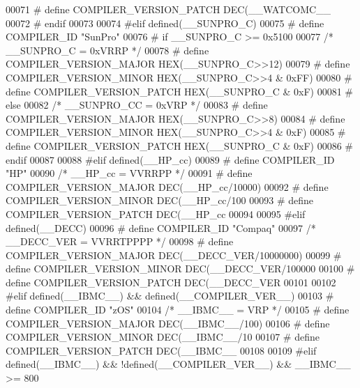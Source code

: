 \begin{DoxyCode}
{{{{{{{{00071 \textcolor{preprocessor}{#  define COMPILER\_VERSION\_PATCH DEC(\_\_WATCOMC\_\_ %
00072 \textcolor{preprocessor}{# endif}
00073 
00074 \textcolor{preprocessor}{#elif defined(\_\_SUNPRO\_C)}
00075 \textcolor{preprocessor}{# define COMPILER\_ID "SunPro"}
00076 \textcolor{preprocessor}{# if \_\_SUNPRO\_C >= 0x5100}
00077    \textcolor{comment}{/* \_\_SUNPRO\_C = 0xVRRP */}
00078 \textcolor{preprocessor}{#  define COMPILER\_VERSION\_MAJOR HEX(\_\_SUNPRO\_C>>12)}
00079 \textcolor{preprocessor}{#  define COMPILER\_VERSION\_MINOR HEX(\_\_SUNPRO\_C>>4 & 0xFF)}
00080 \textcolor{preprocessor}{#  define COMPILER\_VERSION\_PATCH HEX(\_\_SUNPRO\_C    & 0xF)}
00081 \textcolor{preprocessor}{# else}
00082    \textcolor{comment}{/* \_\_SUNPRO\_CC = 0xVRP */}
00083 \textcolor{preprocessor}{#  define COMPILER\_VERSION\_MAJOR HEX(\_\_SUNPRO\_C>>8)}
00084 \textcolor{preprocessor}{#  define COMPILER\_VERSION\_MINOR HEX(\_\_SUNPRO\_C>>4 & 0xF)}
00085 \textcolor{preprocessor}{#  define COMPILER\_VERSION\_PATCH HEX(\_\_SUNPRO\_C    & 0xF)}
00086 \textcolor{preprocessor}{# endif}
00087 
00088 \textcolor{preprocessor}{#elif defined(\_\_HP\_cc)}
00089 \textcolor{preprocessor}{# define COMPILER\_ID "HP"}
00090   \textcolor{comment}{/* \_\_HP\_cc = VVRRPP */}
00091 \textcolor{preprocessor}{# define COMPILER\_VERSION\_MAJOR DEC(\_\_HP\_cc/10000)}
00092 \textcolor{preprocessor}{# define COMPILER\_VERSION\_MINOR DEC(\_\_HP\_cc/100 %
00093 \textcolor{preprocessor}{# define COMPILER\_VERSION\_PATCH DEC(\_\_HP\_cc     %
00094 
00095 \textcolor{preprocessor}{#elif defined(\_\_DECC)}
00096 \textcolor{preprocessor}{# define COMPILER\_ID "Compaq"}
00097   \textcolor{comment}{/* \_\_DECC\_VER = VVRRTPPPP */}
00098 \textcolor{preprocessor}{# define COMPILER\_VERSION\_MAJOR DEC(\_\_DECC\_VER/10000000)}
00099 \textcolor{preprocessor}{# define COMPILER\_VERSION\_MINOR DEC(\_\_DECC\_VER/100000  %
00100 \textcolor{preprocessor}{# define COMPILER\_VERSION\_PATCH DEC(\_\_DECC\_VER         %
00101 
00102 \textcolor{preprocessor}{#elif defined(\_\_IBMC\_\_) && defined(\_\_COMPILER\_VER\_\_)}
00103 \textcolor{preprocessor}{# define COMPILER\_ID "zOS"}
00104   \textcolor{comment}{/* \_\_IBMC\_\_ = VRP */}
00105 \textcolor{preprocessor}{# define COMPILER\_VERSION\_MAJOR DEC(\_\_IBMC\_\_/100)}
00106 \textcolor{preprocessor}{# define COMPILER\_VERSION\_MINOR DEC(\_\_IBMC\_\_/10 %
00107 \textcolor{preprocessor}{# define COMPILER\_VERSION\_PATCH DEC(\_\_IBMC\_\_    %
00108 
00109 \textcolor{preprocessor}{#elif defined(\_\_IBMC\_\_) && !defined(\_\_COMPILER\_VER\_\_) && \_\_IBMC\_\_ >= 800}
}}}}}}}}}}}}}}}
\end{DoxyCode}
